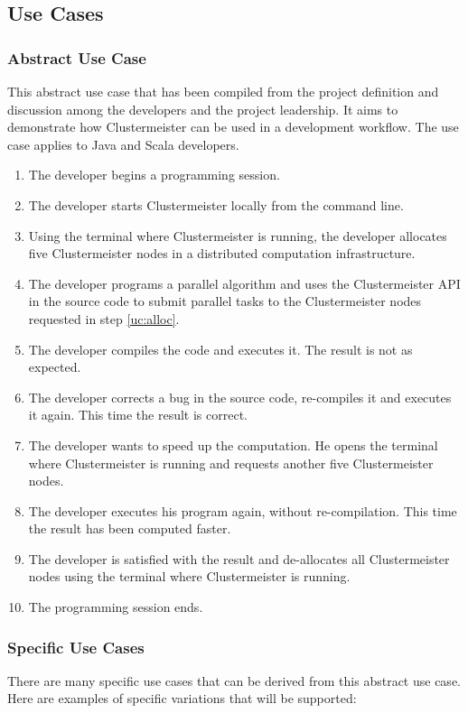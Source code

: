 \documentclass[english]{uzhpub}
\begin{document}
\subsection{Use Cases}

\subsubsection*{Abstract Use Case}
This abstract use case that has been compiled from the project definition and discussion among the developers and the project leadership. It aims to demonstrate how Clustermeister can be used in a development workflow. The use case applies to Java and Scala developers.

\begin{enumerate}
\item \label{uc:start}The developer begins a programming session.
\item The developer starts Clustermeister locally from the command line.
\item \label{uc:alloc}Using the terminal where Clustermeister is running, the developer allocates five Clustermeister nodes in a distributed computation infrastructure.
\item \label{uc:prog}The developer programs a parallel algorithm and uses the Clustermeister API in the source code to submit parallel tasks to the Clustermeister nodes requested in step \ref{uc:alloc}.
\item The developer compiles the code and executes it. The result is not as expected.
\item The developer corrects a bug in the source code, re-compiles it and executes it again. This time the result is correct.
\item The developer wants to speed up the computation. He opens the terminal where Clustermeister is running and requests another five Clustermeister nodes.
\item The developer executes his program again, without re-compilation. This time the result has been computed faster.
\item The developer is satisfied with the result and de-allocates all Clustermeister nodes using the terminal where Clustermeister is running.
\item The programming session ends.
\end{enumerate}

\subsubsection*{Specific Use Cases}
There are many specific use cases that can be derived from this abstract use case. Here are examples of specific variations that will be supported:
\end{document}
